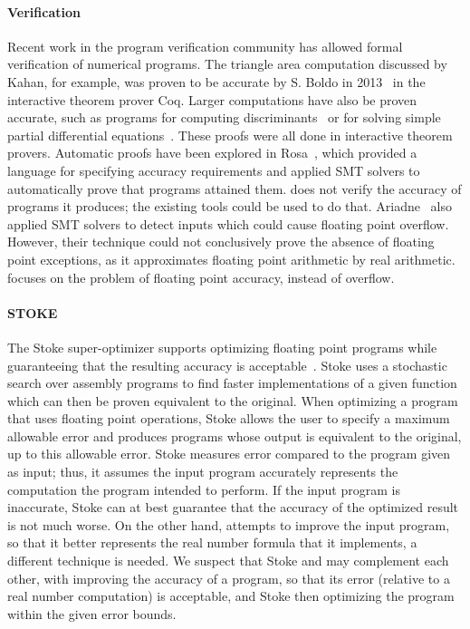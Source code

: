 \documentclass[paper.tex]{subfiles}
\begin{document}
\paragraph{Verification}
Recent work in the program verification community
  has allowed formal verification of numerical programs.
The triangle area computation discussed by Kahan, for example,
  was proven to be accurate by S. Boldo in 2013~\cite{arith13-area-triangle}
  in the interactive theorem prover Coq.
Larger computations have also be proven accurate,
  such as programs for computing discriminants~\cite{ieee09-discriminant-proven}
  or for solving simple partial differential equations~\cite{jar13-wave-equation-prove}.
These proofs were all done in interactive theorem provers.
Automatic proofs have been explored in Rosa~\cite{popl14-rosa},
  which provided a language for specifying accuracy requirements
  and applied SMT solvers to automatically prove
  that programs attained them.
\casio does not verify the accuracy of programs it produces;
  the existing tools could be used to do that.
Ariadne~\cite{popl13-ariadne} also applied SMT solvers
  to detect inputs which could cause floating point overflow.
However, their technique could not conclusively prove
  the absence of floating point exceptions,
  as it approximates floating point arithmetic by real arithmetic.
\casio focuses on the problem of floating point accuracy,
  instead of overflow.

\paragraph{STOKE}
The Stoke super-optimizer supports
  optimizing floating point programs while guaranteeing
  that the resulting accuracy is acceptable~\cite{pldi14-stoke}.
Stoke uses a stochastic search over assembly programs
  to find faster implementations of a given function
  which can then be proven equivalent to the original.
When optimizing a program that uses floating point operations,
  Stoke allows the user to specify a maximum allowable error
  and produces programs whose output is equivalent to the original,
  up to this allowable error.
Stoke measures error compared to the program given as input;
  thus, it assumes the input program accurately represents
  the computation the program intended to perform.
If the input program is inaccurate, Stoke can at best guarantee
  that the accuracy of the optimized result is not much worse.
On the other hand, \casio attempts to improve the input program,
  so that it better represents
  the real number formula that it implements,
  a different technique is needed.
We suspect that Stoke and \casio may complement each other,
  with \casio improving the accuracy of a program,
  so that its error (relative to a real number computation) is acceptable,
  and Stoke then optimizing the program within the given error bounds.
\end{document}
